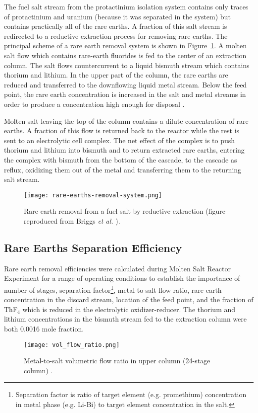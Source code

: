 The fuel salt stream from the protactinium isolation system contains only traces of protactinium and uranium (because it was separated in the system) but contains practically all of the rare earths. A fraction of this salt stream is redirected to a reductive extraction process for removing rare earths.  The principal scheme of a rare earth removal system is shown in Figure~\ref{fig:rare-earth-removal}. A molten salt flow which contains rare-earth fluorides is fed to the center of an extraction column. The salt flows countercurrent to a liquid bismuth stream which contains thorium and lithium. In the upper part of the column, the rare earths are reduced and transferred to the downflowing liquid metal stream. Below the feed point, the rare earth concentration is increased in the salt and metal streams in order to produce a concentration high enough for disposal \cite{briggs_molten-salt_1969}.

Molten salt leaving the top of the column contains a dilute concentration of rare earths. A fraction of this flow is returned back to the reactor while the rest is sent to an electrolytic cell complex. The net effect of the complex is to push thorium and lithium into bismuth and to return extracted rare earths, entering the complex with bismuth from the bottom of the cascade, to the cascade as reflux, oxidizing them out of the metal and transferring them to the returning salt stream.
\begin{figure}[htbp!]
  \centering
        \texttt{[image: rare-earths-removal-system.png]}
    \caption{Rare earth removal from a fuel salt by reductive extraction (figure 
    reproduced from Briggs \emph{et al.} \cite{briggs_molten-salt_1969}).}
    \label{fig:rare-earth-removal}
\end{figure}

\subsection{Rare Earths Separation Efficiency} \label{sec:rare_earth_eff}
Rare earth removal efficiencies were calculated during Molten Salt Reactor Experiment for a range of operating conditions to establish the importance of number of stages, separation factor\footnote{Separation factor is ratio of target element (e.g. promethium) concentration in metal phase (e.g. Li-Bi) to target element concentration in the salt.}, metal-to-salt flow ratio, rare earth concentration in the discard stream, location of the feed point, and the fraction of ThF$_4$ which is reduced in the electrolytic oxidizer-reducer. The thorium and lithium concentrations in the bismuth stream fed to the extraction column were both 0.0016 mole fraction. 
\begin{figure}[htbp!]
    \begin{center}
        \texttt{[image: vol\_flow\_ratio.png]}
    \end{center}
    \caption{Metal-to-salt volumetric flow ratio in upper column (24-stage column) \cite{briggs_molten-salt_1969}.}
    \label{fig:vol-flow-ratio}
\end{figure}

